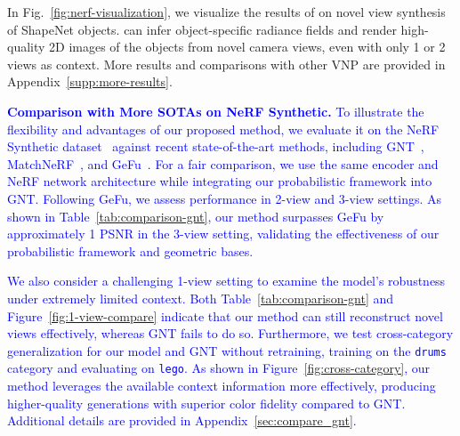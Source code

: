 {
In Fig.~\ref{fig:nerf-visualization}, we visualize the results of \method{} on novel view synthesis of ShapeNet objects.
\method{} can infer object-specific radiance fields and render high-quality 2D images of the objects from novel camera views, even with only 1 or 2 views as context. More results and comparisons with other VNP are provided in Appendix~\ref{supp:more-results}.}


\textcolor{blue}{\noindent \textbf{Comparison with More SOTAs on NeRF Synthetic.} To illustrate the flexibility and advantages of our proposed method, we evaluate it on the NeRF Synthetic dataset~\citep{mildenhall2021nerf} against recent state-of-the-art methods, including GNT~\citep{wang2022attention}, MatchNeRF~\citep{chen2023explicit}, and GeFu~\citep{liu2024geometry}. For a fair comparison, we use the same encoder and NeRF network architecture while integrating our probabilistic framework into GNT. Following GeFu, we assess performance in 2-view and 3-view settings. As shown in Table~\ref{tab:comparison-gnt}, our method surpasses GeFu by approximately 1 PSNR in the 3-view setting, validating the effectiveness of our probabilistic framework and geometric bases.}

\textcolor{blue}{We also consider a challenging 1-view setting to examine the model’s robustness under extremely limited context. Both Table~\ref{tab:comparison-gnt} and Figure~\ref{fig:1-view-compare} indicate that our method can still reconstruct novel views effectively, whereas GNT fails to do so. Furthermore, we test cross-category generalization for our model and GNT without retraining, training on the \texttt{drums} category and evaluating on \texttt{lego}. As shown in Figure~\ref{fig:cross-category}, our method leverages the available context information more effectively, producing higher-quality generations with superior color fidelity compared to GNT. Additional details are provided in Appendix~\ref{sec:compare_gnt}.}


